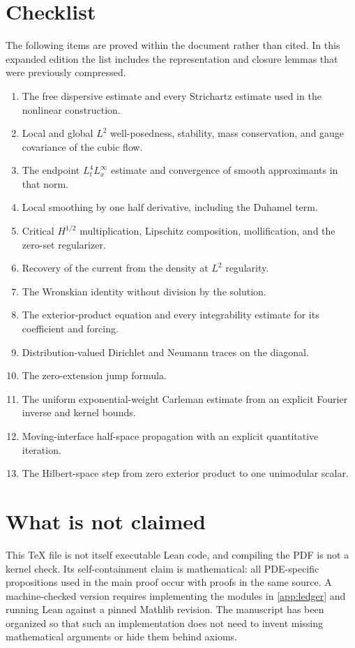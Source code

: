 \documentclass[11pt,oneside]{book}
\theoremstyle{definition}
\theoremstyle{remark}
\newcommand{\1}{\mathbf 1}
\begin{document}
\section{Checklist}
The following items are proved within the document rather than cited.  In
this expanded edition the list includes the representation and closure
lemmas that were previously compressed.
\begin{enumerate}
\item The free dispersive estimate and every Strichartz estimate used in the
      nonlinear construction.
\item Local and global $L^2$ well-posedness, stability, mass conservation,
      and gauge covariance of the cubic flow.
\item The endpoint $L^4_tL^\infty_x$ estimate and convergence of smooth
      approximants in that norm.
\item Local smoothing by one half derivative, including the Duhamel term.
\item Critical $H^{1/2}$ multiplication, Lipschitz composition, mollification,
      and the zero-set regularizer.
\item Recovery of the current from the density at $L^2$ regularity.
\item The Wronskian identity without division by the solution.
\item The exterior-product equation and every integrability estimate for its
      coefficient and forcing.
\item Distribution-valued Dirichlet and Neumann traces on the diagonal.
\item The zero-extension jump formula.
\item The uniform exponential-weight Carleman estimate from an explicit
      Fourier inverse and kernel bounds.
\item Moving-interface half-space propagation with an explicit quantitative
      iteration.
\item The Hilbert-space step from zero exterior product to one unimodular
      scalar.
\end{enumerate}

\section{What is not claimed}
This TeX file is not itself executable Lean code, and compiling the PDF is not
a kernel check.  Its self-containment claim is mathematical: all
PDE-specific propositions used in the main proof occur with proofs in the
same source.  A machine-checked version requires implementing the modules in
\cref{app:ledger} and running Lean against a pinned Mathlib revision.  The
manuscript has been organized so that such an implementation does not need to
invent missing mathematical arguments or hide them behind axioms.
\end{document}
